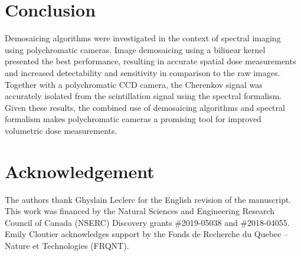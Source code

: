 \documentclass[12pt]{iopart}
\begin{document}
\section{Conclusion}
Demosaicing algorithms were investigated in the context of spectral imaging using polychromatic cameras. Image demosaicing using a bilinear kernel presented the best performance, resulting in accurate spatial dose measurements and increased detectability and sensitivity in comparison to the raw images. Together with a polychromatic CCD camera, the Cherenkov signal was accurately isolated from the scintillation signal using the spectral formalism. Given these results, the combined use of demosaicing algorithms and spectral formalism makes polychromatic cameras a promising tool for improved volumetric dose measurements.

\section{Acknowledgement} 

The authors thank Ghyslain Leclerc for the English revision of the manuscript. This work was financed by the Natural Sciences and Engineering Research Council of Canada (NSERC) Discovery grants \#2019-05038 and \#2018-04055. Emily Cloutier acknowledges support by the Fonds de Recherche du Quebec – Nature et Technologies (FRQNT). 


\clearpage

\begin{small}
\printbibliography[heading=bibintoc]
\end{small}
\end{document}
